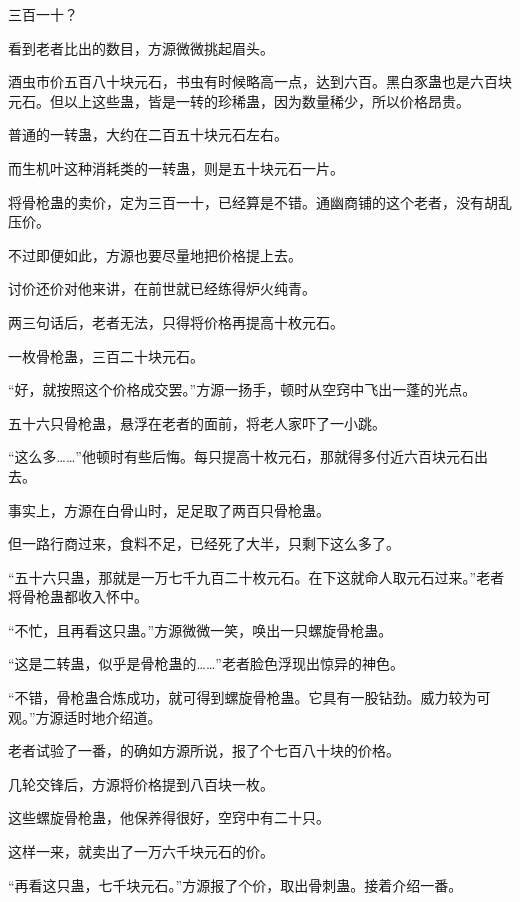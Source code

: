 
\begin{this_body}



三百一十？

看到老者比出的数目，方源微微挑起眉头。

酒虫市价五百八十块元石，书虫有时候略高一点，达到六百。黑白豕蛊也是六百块元石。但以上这些蛊，皆是一转的珍稀蛊，因为数量稀少，所以价格昂贵。

普通的一转蛊，大约在二百五十块元石左右。

而生机叶这种消耗类的一转蛊，则是五十块元石一片。

将骨枪蛊的卖价，定为三百一十，已经算是不错。通幽商铺的这个老者，没有胡乱压价。

不过即便如此，方源也要尽量地把价格提上去。

讨价还价对他来讲，在前世就已经练得炉火纯青。

两三句话后，老者无法，只得将价格再提高十枚元石。

一枚骨枪蛊，三百二十块元石。

“好，就按照这个价格成交罢。”方源一扬手，顿时从空窍中飞出一蓬的光点。

五十六只骨枪蛊，悬浮在老者的面前，将老人家吓了一小跳。

“这么多……”他顿时有些后悔。每只提高十枚元石，那就得多付近六百块元石出去。

事实上，方源在白骨山时，足足取了两百只骨枪蛊。

但一路行商过来，食料不足，已经死了大半，只剩下这么多了。

“五十六只蛊，那就是一万七千九百二十枚元石。在下这就命人取元石过来。”老者将骨枪蛊都收入怀中。

“不忙，且再看这只蛊。”方源微微一笑，唤出一只螺旋骨枪蛊。

“这是二转蛊，似乎是骨枪蛊的……”老者脸色浮现出惊异的神色。

“不错，骨枪蛊合炼成功，就可得到螺旋骨枪蛊。它具有一股钻劲。威力较为可观。”方源适时地介绍道。

老者试验了一番，的确如方源所说，报了个七百八十块的价格。

几轮交锋后，方源将价格提到八百块一枚。

这些螺旋骨枪蛊，他保养得很好，空窍中有二十只。

这样一来，就卖出了一万六千块元石的价。

“再看这只蛊，七千块元石。”方源报了个价，取出骨刺蛊。接着介绍一番。


\end{this_body}
